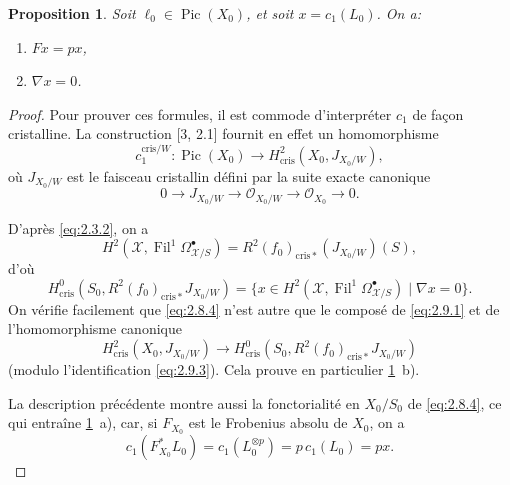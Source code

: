 \documentclass[12pt,a4paper]{article}
\theoremstyle{plain}
\newtheorem{proposition}[theorem]{Proposition}
\theoremstyle{definition}
\theoremstyle{remark}
\DeclareMathOperator{\Pic}{Pic}
\DeclareMathOperator{\Fil}{Fil}
\newcommand{\cris}{\mathrm{cris}}
\begin{document}
\begin{proposition}\label{prop:2.9}
Soit $\ell_0 \in \Pic(X_0)$, et soit $x = c_1(L_0)$. On a:
\begin{enumerate}[label=\alph*)]
\item $Fx = px$,
\item $\nabla x = 0$.
\end{enumerate}
\end{proposition}

\begin{proof}
Pour prouver ces formules, il est commode d'interpréter $c_1$ de façon cristalline. La construction [3, 2.1] fournit en effet un homomorphisme
\begin{equation}\label{eq:2.9.1}
c_1^{\cris/W}: \Pic(X_0) \to H^2_{\cris}(X_0, J_{X_0/W}),
\end{equation}
où $J_{X_0/W}$ est le faisceau cristallin défini par la suite exacte canonique
\begin{equation}\label{eq:2.9.2}
0 \to J_{X_0/W} \to \mathcal{O}_{X_0/W} \to \mathcal{O}_{X_0} \to 0.
\end{equation}

D'après \eqref{eq:2.3.2}, on a
\[
H^2(\mathcal{X}, \Fil^1 \Omega^{\bullet}_{\mathcal{X}/S}) = R^2(f_0)_{\cris*}(J_{X_0/W})(S),
\]
d'où
\begin{equation}\label{eq:2.9.3}
H^0_{\cris}(S_0, R^2(f_0)_{\cris*} J_{X_0/W}) = \{x \in H^2(\mathcal{X}, \Fil^1 \Omega^{\bullet}_{\mathcal{X}/S}) \mid \nabla x = 0\}.
\end{equation}
On vérifie facilement que \eqref{eq:2.8.4} n'est autre que le composé de \eqref{eq:2.9.1} et de l'homomorphisme canonique
\begin{equation}\label{eq:2.9.4}
H^2_{\cris}(X_0, J_{X_0/W}) \to H^0_{\cris}(S_0, R^2(f_0)_{\cris*} J_{X_0/W})
\end{equation}
(modulo l'identification \eqref{eq:2.9.3}). Cela prouve en particulier \ref{prop:2.9}~b).

La description précédente montre aussi la fonctorialité en $X_0/S_0$ de \eqref{eq:2.8.4}, ce qui entraîne \ref{prop:2.9}~a), car, si $F_{X_0}$ est le Frobenius absolu de $X_0$, on a
\[
c_1(F_{X_0}^* L_0) = c_1(L_0^{\otimes p}) = p\, c_1(L_0) = px.
\]\qedhere
\end{proof}
\end{document}
